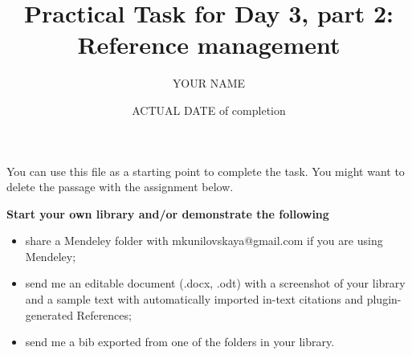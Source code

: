 \documentclass[a4paper,11pt]{article}
\title{Practical Task for Day 3, part 2: \\Reference management}
\author{YOUR NAME}
\date{ACTUAL DATE of completion}
\begin{document}
	
	\maketitle

\bigskip

You can use this file as a starting point to complete the task. You might want to delete the passage with the assignment below.

\bigskip

\textbf{Start your own library and/or demonstrate the following}

	\begin{itemize}
		\item share a Mendeley folder with mkunilovskaya@gmail.com if you are using Mendeley;
		\item send me an editable document (.docx, .odt) with a screenshot of your library and a sample text with automatically imported in-text citations and plugin-generated References;  
		\item send me a bib exported from one of the folders in your library.
	\end{itemize}

	
\end{document}
